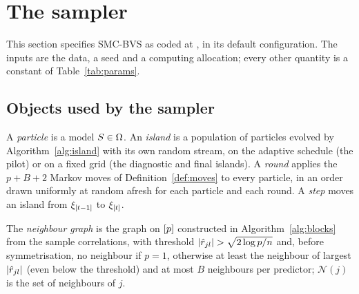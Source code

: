 \section{The sampler}\label{sec:sampler}

This section specifies SMC-BVS as coded at , in its default configuration. The inputs are
the data, a seed and a computing allocation; every other quantity is a constant of Table~\ref{tab:params}.

\subsection{Objects used by the sampler}\label{sec:sampler-objects}

\begin{definition}\label{def:island}
A \emph{particle} is a model $S\in\Omega$. An \emph{island} is a population of particles evolved by
Algorithm~\ref{alg:island} with its own random stream, on the adaptive schedule (the pilot) or on a fixed grid (the diagnostic and final islands). A \emph{round} applies the $p+B+2$ Markov moves of
Definition~\ref{def:moves} to every particle, in an order drawn uniformly at random afresh for each particle and each
round. A \emph{step} moves an island from $\xi_{[t-1]}$ to $\xi_{[t]}$.
\end{definition}

\begin{definition}\label{def:nbgraph}
The \emph{neighbour graph} is the graph on $[p]$ constructed in Algorithm~\ref{alg:blocks} from the sample
correlations, with threshold $\lvert \hat r_{jl}\rvert>\sqrt{2\log p/n}$ and, before symmetrisation, no neighbour if $p=1$, otherwise at least the
neighbour of largest $\lvert \hat r_{jl}\rvert$ (even below the threshold) and at most $B$ neighbours per predictor; $\mathcal N(j)$ is the set of neighbours of $j$.
\end{definition}

